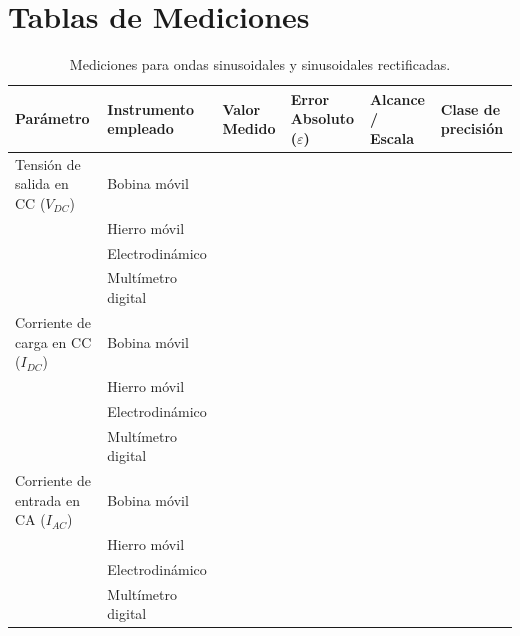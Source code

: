 \section{Tablas de Mediciones}

\begin{table}[H]
\centering
\footnotesize
\begin{tabularx}{\textwidth}{| >{\hsize}Y | >{\hsize}Y | >{\hsize}Y | >{\hsize}Y | >{\hsize}Y | >{\hsize}Y |}
\hline
Parámetro & Instrumento empleado & Valor Medido & Error Absoluto ($\varepsilon$) & Alcance / Escala & Clase de precisión \\ \hline
Tensión de salida en CC ($V_{DC}$) & Bobina móvil & & & & \\ 
 & Hierro móvil & & & & \\ 
 & Electrodinámico & & & & \\ 
 & Multímetro digital & & & & \\ \hline
Corriente de carga en CC ($I_{DC}$) & Bobina móvil & & & & \\ 
 & Hierro móvil & & & & \\ 
 & Electrodinámico & & & & \\ 
 & Multímetro digital & & & & \\ \hline
Corriente de entrada en CA ($I_{AC}$) & Bobina móvil & & & & \\ 
 & Hierro móvil & & & & \\ 
 & Electrodinámico & & & & \\ 
 & Multímetro digital & & & & \\ \hline
\end{tabularx}
\caption{Mediciones para ondas sinusoidales y sinusoidales rectificadas.}
\label{tab:mediciones-sinusoidales}
\end{table}

